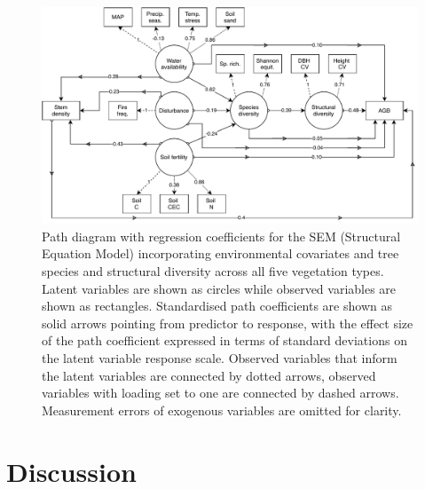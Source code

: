 \begin{refsection}
\begin{figure}
	\includegraphics[width=\linewidth]{img/full.drawio}
	\caption[Path diagram of full Structural Equation Model]{Path diagram with regression coefficients for the SEM (Structural Equation Model) incorporating environmental covariates and tree species and structural diversity across all five vegetation types. Latent variables are shown as circles while observed variables are shown as rectangles. Standardised path coefficients are shown as solid arrows pointing from predictor to response, with the effect size of the path coefficient expressed in terms of standard deviations on the latent variable response scale. Observed variables that inform the latent variables are connected by dotted arrows, observed variables with loading set to one are connected by dashed arrows. Measurement errors of exogenous variables are omitted for clarity.}
	\label{befr:full_mod}
\end{figure}

\section{Discussion}
\label{befr:sec:discussion}


\end{refsection}
